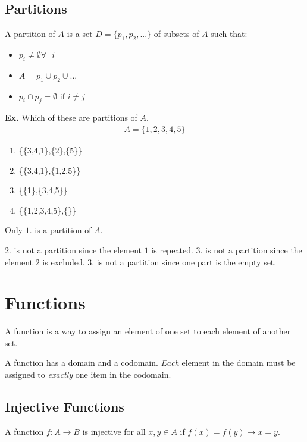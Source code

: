 \documentclass[12pt,letterpaper]{article} \usepackage{amsmath} \usepackage{graphicx}  \usepackage{longtable}  \usepackage{amssymb}
\begin{document}
        \subsection{Partitions}
        A partition of $A$ is a set $D=\{p_1,p_2,...\}$ of subsets of $A$ such that:
        \begin{itemize}[noitemsep]
            \item $p_i \ne \emptyset \forall \text{ } i$
            \item $A = p_1 \cup p_2 \cup ...$
            \item $p_i \cap p_j = \emptyset \text{ if } i\ne j$
        \end{itemize}

        \begin{mdframed}
            \textbf{Ex. } Which of these are partitions of $A$.
            \begin{align*}
                A = \{1,2,3,4,5\}
            \end{align*}

            \begin{enumerate}
                \item \{\{3,4,1\},\{2\},\{5\}\}
                \item \{\{3,4,1\},\{1,2,5\}\}
                \item \{\{1\},\{3,4,5\}\}
                \item \{\{1,2,3,4,5\},\{\}\}
            \end{enumerate}

            Only $1.$ is a partition of $A$.

            $2.$ is not a partition since the element $1$ is repeated. $3.$ is not a partition since the element $2$ is excluded. $3.$ is not a partition since one part is the empty set. 
        \end{mdframed}

    \section{Functions}
    A function is a way to assign an element of one set to each element of another set. 
    
    A function has a domain and a codomain. \emph{Each} element in the domain must be assigned to \emph{exactly} one item in the codomain. 

        \subsection{Injective Functions}
        A function $f:A\rightarrow B$ is injective for all $x,y \in A$ if $f(x)=f(y) \rightarrow x=y$.
\end{document}
